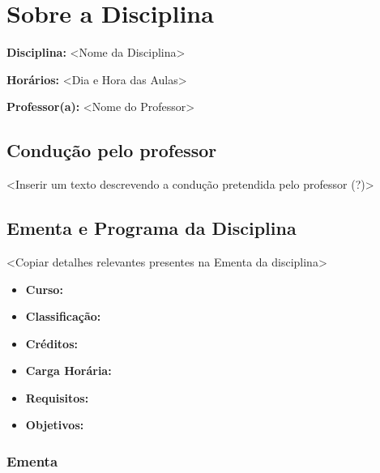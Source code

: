 \documentclass[12pt, a4paper]{article}
\begin{document}
\maketitle

\section{Sobre a Disciplina} \label{sec:disciplina}


\textbf{Disciplina:} <Nome da Disciplina>

\textbf{Horários:} <Dia e Hora das Aulas>

\textbf{Professor(a):} <Nome do Professor>

\subsection{Condução pelo professor} \label{subsec:conducao}


<Inserir um texto descrevendo a condução pretendida pelo professor (?)>

\subsection{Ementa e Programa da Disciplina} \label{subsec:ementa_e_programa}

<Copiar detalhes relevantes presentes na Ementa da disciplina>

\begin{itemize}
    \item \textbf{Curso:}
    \item \textbf{Classificação:}
    \item \textbf{Créditos:}
    \item \textbf{Carga Horária:}
    \item \textbf{Requisitos:}
    \item \textbf{Objetivos:}
\end{itemize}

\subsubsection{Ementa} \label{subsubsec:ementa}
\end{document}
